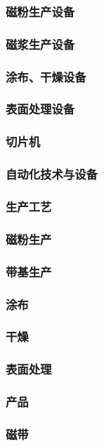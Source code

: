 \documentclass[UTF8]{../../ApplicationUniverse}
\begin{document}
    \subsubsection{磁粉生产设备}
    \subsubsection{磁浆生产设备}
    \subsubsection{涂布、干燥设备}
    \subsubsection{表面处理设备}
    \subsubsection{切片机}
    \subsubsection{自动化技术与设备}
\subsubsection{生产工艺}
    \subsubsection{磁粉生产}
    \subsubsection{带基生产}
    \subsubsection{涂布}
    \subsubsection{干燥}
    \subsubsection{表面处理}
\subsubsection{产品}
    \subsubsection{磁带}
\end{document}
